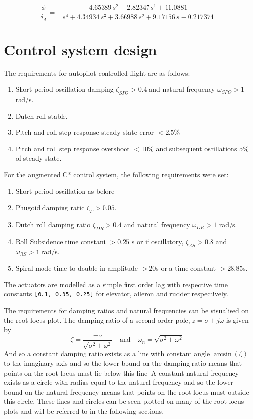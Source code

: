 \documentclass{article}
\begin{document}
\begin{equation}
    \frac{\phi}{\delta_A} =
    -\frac{4.65389\,s^2+2.82347\,s^1+11.0881}{s^4+4.34934\,s^3+3.66988\,s^2+9.17156\,s-0.217374}
    \label{eq:roll_ail}
\end{equation}


\section{Control system design}

The requirements for autopilot controlled flight are as follows:
\begin{enumerate}
    \renewcommand{\labelenumi}{\alph{enumi})}
    \item Short period oscillation damping $\zeta_{SPO} > 0.4$ and natural frequency $\omega_{SPO} > 1$ rad/s.
    \item Dutch roll stable. \label{req:DR}
    \item Pitch and roll step response steady state error $< 2.5 \%$
    \item Pitch and roll step response overshoot $< 10 \%$ and subsequent oscillations $5 \%$ of steady state.
\end{enumerate}

For the augmented C* control system, the following requirements were set:
\begin{enumerate}
    \renewcommand{\labelenumi}{\roman{enumi})}
    \item Short period oscillation as before
    \item Phugoid damping ratio $\zeta_{P} > 0.05$.
    \item Dutch roll damping ratio $\zeta_{DR} > 0.4$ and natural frequency $\omega_{DR} > 1$ rad/s.
    \item Roll Subsidence time constant $> 0.25$ s or if oscillatory, $\zeta_{RS} > 0.8$ and $\omega_{RS} > 1$ rad/s. \label{req:RS}
    \item Spiral mode time to double in amplitude $>20$s or a time constant $>28.85$s.
\end{enumerate}

The actuators are modelled as a simple first order lag with respective time constants \texttt{[0.1, 0.05, 0.25]} for elevator, aileron and rudder respectively.

The requirements for damping ratios and natural frequencies can be visualised on the root locus plot.
The damping ratio of a second order pole, $z = \sigma \pm j\omega$ is given by
\begin{equation}
    \zeta = \frac{-\sigma}{\sqrt{\sigma^2 + \omega^2}} \quad \text{and} \quad \omega_n = \sqrt{\sigma^2 + \omega^2}
\end{equation}
And so a constant damping ratio exists as a line with constant angle $\arcsin(\zeta)$ to the imaginary axis and so the lower bound on the damping ratio means that points on the root locus must lie below this line.
A constant natural frequency exists as a circle with radius equal to the natural frequency and so the lower bound on the natural frequency means that points on the root locus must outside this circle.
These lines and circles can be seen plotted on many of the root locus plots and will be referred to in the following sections.
\end{document}
